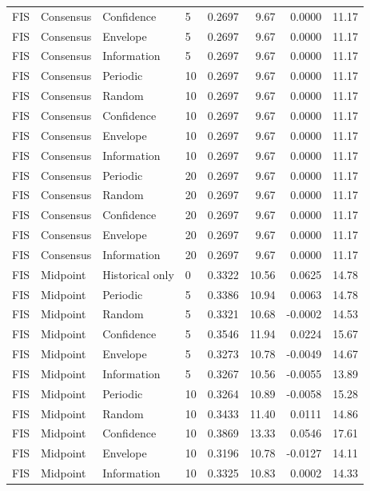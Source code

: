 \begin{longtable}{llllrrrr}
FIS & Consensus & Confidence & 5 & 0.2697 & 9.67 & 0.0000 & 11.17 \\
FIS & Consensus & Envelope & 5 & 0.2697 & 9.67 & 0.0000 & 11.17 \\
FIS & Consensus & Information & 5 & 0.2697 & 9.67 & 0.0000 & 11.17 \\
FIS & Consensus & Periodic & 10 & 0.2697 & 9.67 & 0.0000 & 11.17 \\
FIS & Consensus & Random & 10 & 0.2697 & 9.67 & 0.0000 & 11.17 \\
FIS & Consensus & Confidence & 10 & 0.2697 & 9.67 & 0.0000 & 11.17 \\
FIS & Consensus & Envelope & 10 & 0.2697 & 9.67 & 0.0000 & 11.17 \\
FIS & Consensus & Information & 10 & 0.2697 & 9.67 & 0.0000 & 11.17 \\
FIS & Consensus & Periodic & 20 & 0.2697 & 9.67 & 0.0000 & 11.17 \\
FIS & Consensus & Random & 20 & 0.2697 & 9.67 & 0.0000 & 11.17 \\
FIS & Consensus & Confidence & 20 & 0.2697 & 9.67 & 0.0000 & 11.17 \\
FIS & Consensus & Envelope & 20 & 0.2697 & 9.67 & 0.0000 & 11.17 \\
FIS & Consensus & Information & 20 & 0.2697 & 9.67 & 0.0000 & 11.17 \\
FIS & Midpoint & Historical only & 0 & 0.3322 & 10.56 & 0.0625 & 14.78 \\
FIS & Midpoint & Periodic & 5 & 0.3386 & 10.94 & 0.0063 & 14.78 \\
FIS & Midpoint & Random & 5 & 0.3321 & 10.68 & -0.0002 & 14.53 \\
FIS & Midpoint & Confidence & 5 & 0.3546 & 11.94 & 0.0224 & 15.67 \\
FIS & Midpoint & Envelope & 5 & 0.3273 & 10.78 & -0.0049 & 14.67 \\
FIS & Midpoint & Information & 5 & 0.3267 & 10.56 & -0.0055 & 13.89 \\
FIS & Midpoint & Periodic & 10 & 0.3264 & 10.89 & -0.0058 & 15.28 \\
FIS & Midpoint & Random & 10 & 0.3433 & 11.40 & 0.0111 & 14.86 \\
FIS & Midpoint & Confidence & 10 & 0.3869 & 13.33 & 0.0546 & 17.61 \\
FIS & Midpoint & Envelope & 10 & 0.3196 & 10.78 & -0.0127 & 14.11 \\
FIS & Midpoint & Information & 10 & 0.3325 & 10.83 & 0.0002 & 14.33 \\

\end{longtable}
